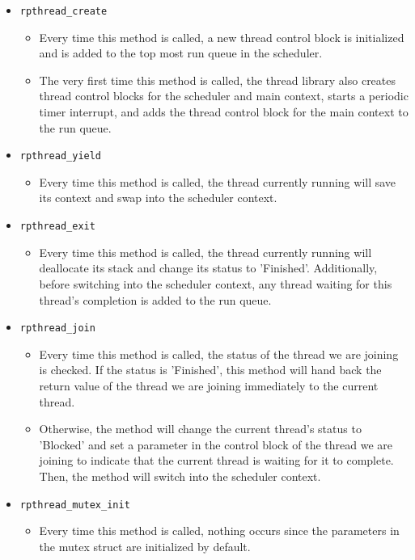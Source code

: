 \documentclass{article}
\begin{document}
\begin{itemize}
    \item \texttt{rpthread\_create}
    \begin{itemize}
      \item[] Every time this method is called, a new thread control block is initialized and is added to the top most run queue in the scheduler.
      \item[] The very first time this method is called, the thread library also creates thread control blocks for the scheduler and main context, starts a periodic timer interrupt, and adds the thread control block for the main context to the run queue.
    \end{itemize}
    
    \item \texttt{rpthread\_yield}
    \begin{itemize}
      \item[] Every time this method is called, the thread currently running will save its context and swap into the scheduler context.
    \end{itemize}
    
    \item \texttt{rpthread\_exit}
    \begin{itemize}
      \item[] Every time this method is called, the thread currently running will deallocate its stack and change its status to 'Finished'. Additionally, before switching into the scheduler context, any thread waiting for this thread's completion is added to the run queue.
    \end{itemize}
    
    \item \texttt{rpthread\_join}
    \begin{itemize}
      \item[] Every time this method is called, the status of the thread we are joining is checked. If the status is 'Finished', this method will hand back the return value of the thread we are joining immediately to the current thread. 
      \item[] Otherwise, the method will change the current thread's status to 'Blocked' and set a parameter in the control block of the thread we are joining to indicate that the current thread is waiting for it to complete. Then, the method will switch into the scheduler context. 
    \end{itemize}
    
    \item \texttt{rpthread\_mutex\_init}
    \begin{itemize}
      \item[] Every time this method is called, nothing occurs since the parameters in the mutex struct are initialized by default.
    \end{itemize}
    

\end{itemize}
\end{document}
